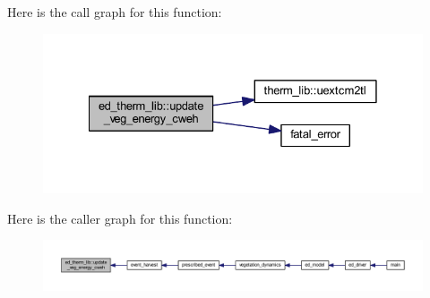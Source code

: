 Here is the call graph for this function\+:\nopagebreak
\begin{figure}[H]
\begin{center}
\leavevmode
\includegraphics[width=328pt]{namespaceed__therm__lib_ae2a805729a52bf5814d2c3a0d84f6fe8_cgraph}
\end{center}
\end{figure}




Here is the caller graph for this function\+:\nopagebreak
\begin{figure}[H]
\begin{center}
\leavevmode
\includegraphics[width=350pt]{namespaceed__therm__lib_ae2a805729a52bf5814d2c3a0d84f6fe8_icgraph}
\end{center}
\end{figure}


